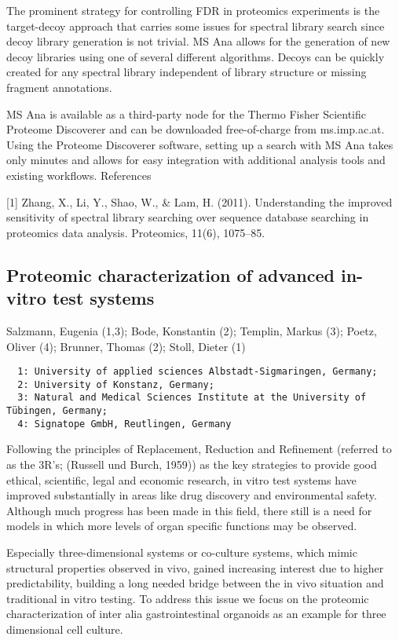 {The prominent strategy for controlling FDR in proteomics experiments is the target-decoy approach that carries some issues for spectral library search since decoy library generation is not trivial. MS Ana allows for the generation of new decoy libraries using one of several different algorithms. Decoys can be quickly created for any spectral library independent of library structure or missing fragment annotations.

MS Ana is available as a third-party node for the Thermo Fisher Scientific Proteome Discoverer and can be downloaded free-of-charge from ms.imp.ac.at. Using the Proteome Discoverer software, setting up a search with MS Ana takes only minutes and allows for easy integration with additional analysis tools and existing workflows.
References

[1] Zhang, X., Li, Y., Shao, W., \& Lam, H. (2011). Understanding the improved sensitivity of spectral library searching over sequence database searching in proteomics data analysis. Proteomics, 11(6), 1075–85.


\subsection*{\color{eubicRed} Proteomic characterization of advanced in-vitro test systems}
{\color{eubicGray}Salzmann, Eugenia (1,3);
Bode, Konstantin (2);
Templin, Markus (3);
Poetz, Oliver (4);
Brunner, Thomas (2);
Stoll, Dieter (1)}
{\color{eubicGray}\begin{verbatim}
  1: University of applied sciences Albstadt-Sigmaringen, Germany;
  2: University of Konstanz, Germany;
  3: Natural and Medical Sciences Institute at the University of Tübingen, Germany;
  4: Signatope GmbH, Reutlingen, Germany
\end{verbatim}}

Following the principles of Replacement, Reduction and Refinement (referred to as the 3R’s; (Russell und Burch, 1959)) as the key strategies to provide good ethical, scientific, legal and economic research, in vitro test systems have improved substantially in areas like drug discovery and environmental safety. Although much progress has been made in this field, there still is a need for models in which more levels of organ specific functions may be observed. 

Especially three-dimensional systems or co-culture systems, which mimic structural properties observed in vivo, gained increasing interest due to higher predictability, building a long needed bridge between the in vivo situation and traditional in vitro testing. To address this issue we focus on the proteomic characterization of inter alia gastrointestinal organoids as an example for three dimensional cell culture.

}
